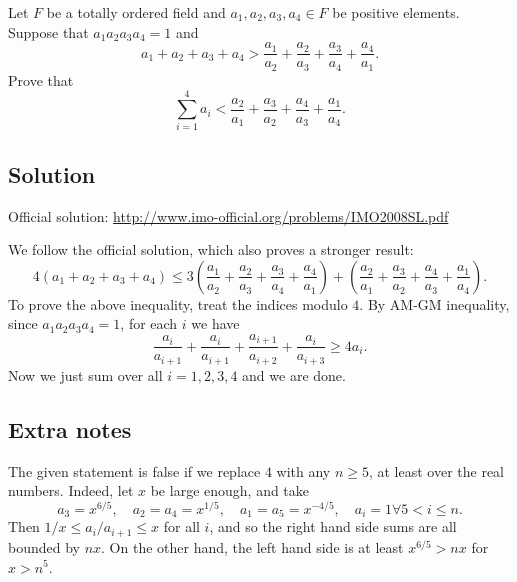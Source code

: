 Let $F$ be a totally ordered field and $a_1, a_2, a_3, a_4 \in F$ be positive elements.
Suppose that $a_1 a_2 a_3 a_4 = 1$ and
\[ a_1 + a_2 + a_3 + a_4 > \frac{a_1}{a_2} + \frac{a_2}{a_3} + \frac{a_3}{a_4} + \frac{a_4}{a_1}. \]
Prove that
\[ \sum_{i = 1}^4 a_i < \frac{a_2}{a_1} + \frac{a_3}{a_2} + \frac{a_4}{a_3} + \frac{a_1}{a_4}. \]



\subsection*{Solution}

Official solution: \url{http://www.imo-official.org/problems/IMO2008SL.pdf}

We follow the official solution, which also proves a stronger result:
\[ 4(a_1 + a_2 + a_3 + a_4) \leq 3 \left(\frac{a_1}{a_2} + \frac{a_2}{a_3} + \frac{a_3}{a_4} + \frac{a_4}{a_1}\right) + \left(\frac{a_2}{a_1} + \frac{a_3}{a_2} + \frac{a_4}{a_3} + \frac{a_1}{a_4}\right). \] 
To prove the above inequality, treat the indices modulo $4$.
By AM-GM inequality, since $a_1 a_2 a_3 a_4 = 1$, for each $i$ we have
\[ \frac{a_i}{a_{i + 1}} + \frac{a_i}{a_{i + 1}} + \frac{a_{i + 1}}{a_{i + 2}} + \frac{a_i}{a_{i + 3}} \geq 4 a_i. \]
Now we just sum over all $i = 1, 2, 3, 4$ and we are done.



\subsection*{Extra notes}

The given statement is false if we replace $4$ with any $n \geq 5$, at least over the real numbers.
Indeed, let $x$ be large enough, and take
\[ a_3 = x^{6/5}, \quad a_2 = a_4 = x^{1/5}, \quad a_1 = a_5 = x^{-4/5}, \quad a_i = 1 \forall 5 < i \leq n. \]
Then $1/x \leq a_i/a_{i + 1} \leq x$ for all $i$, and so the right hand side sums are all bounded by $nx$.
On the other hand, the left hand side is at least $x^{6/5} > nx$ for $x > n^5$.
